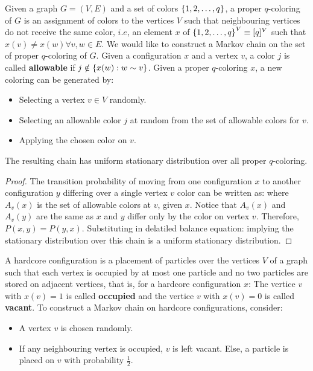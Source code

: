 \documentclass[letterpaper,english,10pt]{article}
\begin{document}
\begin{shaded}
\begin{exmp}
Given a graph $G = (V,E)$ and a set of colors $\left\{1,2,\dots,q\right\}$, a proper $q$-coloring of $G$ is an assignment of colors to the vertices $V$ such that neighbouring vertices do not receive the same color, $i.e$, an element $x$ of $\left\{1,2,\dots,q\right\}^V \equiv [q]^V$ such that $x(v) \neq x(w) \forall v,w \in E$. We would like to construct a Markov chain on the set of proper $q$-coloring of $G$.
\newline
Given a configuration $x$ and a vertex $v$, a color $j$ is called \textbf{allowable} if $j \notin \left\{x(w) : w \sim v\right\}$.
\newline
Given a proper $q$-coloring $x$, a new coloring can be generated by:
\begin{itemize}
\item Selecting a vertex $v \in V$ randomly.
\item Selecting an allowable color $j$ at random from the set of allowable colors for $v$.
\item Applying the chosen color on $v$.
\end{itemize} 
\begin{lem}
The resulting chain has uniform stationary distribution over all proper $q$-coloring.
\end{lem}
\begin{proof}
The transition probability of moving from one configuration $x$ to another configuration $y$ differing over a single vertex $v$ color can be written as:
where $A_v(x)$ is the set of allowable colors at $v$, given $x$.
Notice that $A_v(x)$ and $A_v(y)$ are the same as $x$ and $y$ differ only by the color on vertex $v$.
Therefore, $P(x,y) = P(y,x)$. Substituting in delatiled balance equation:
implying the stationary distribution over this chain is a uniform stationary distribution.
\end{proof}

\end{exmp}
\end{shaded}
\begin{shaded}
\begin{exmp}
A hardcore configuration is a placement of particles over the vertices $V$ of a graph such that each vertex is occupied by at most one particle and no two particles are stored on adjacent vertices, that is, for a hardcore configuration $x$:
The vertice $v$ with $x(v) = 1$ is called \textbf{occupied} and the vertice $v$ with $x(v) = 0$ is called \textbf{vacant}.
\newline
To construct a Markov chain on hardcore configurations, consider:
\begin{itemize}
\item A vertex $v$ is chosen randomly.
\item If any neighbouring vertex is occupied, $v$ is left vacant. Else, a particle is placed on $v$ with probability $\frac{1}{2}$.
\end{itemize}  
\end{exmp}
\end{shaded}
\end{document}

